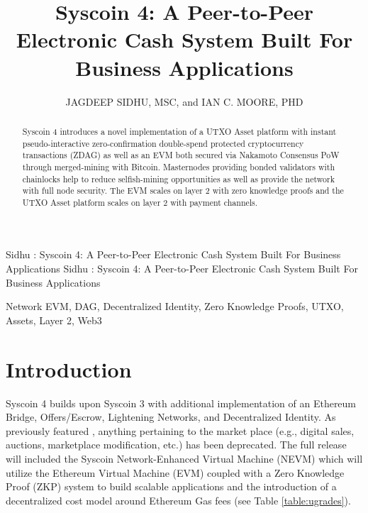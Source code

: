 \documentclass[peerreview]{ieeesyscoin}
\begin{document}
\linenumbers
\history{}

\title{\centering Syscoin 4: A Peer-to-Peer Electronic Cash System Built For Business Applications}
\author{\centering  \uppercase{Jagdeep Sidhu, MSc}, 
and \uppercase{Ian C. Moore, PhD}}

\address[1]{\centering Syscoin Core Developer, Blockchain Foundry Inc.(e-mail: jsidhu@blockchainfoundry.co)}
\address[2]{\centering  (Syscoin Researcher, e-mail: imoore@syscoin.org)}
\tfootnote{}

\markboth
{Sidhu \headeretal: Syscoin 4: A Peer-to-Peer Electronic Cash System Built For Business Applications}
{Sidhu \headeretal: Syscoin 4: A Peer-to-Peer Electronic Cash System Built For Business Applications}

\corresp{}

\begin{abstract}
Syscoin 4 introduces a novel implementation of a UTXO Asset platform with instant pseudo-interactive zero-confirmation double-spend protected cryptocurrency transactions (ZDAG) as well as an EVM both secured via Nakamoto Consensus PoW through merged-mining with Bitcoin. Masternodes providing bonded validators with chainlocks help to reduce selfish-mining opportunities as well as provide the network with full node security. The EVM scales on layer 2 with zero knowledge proofs and the UTXO Asset platform scales on layer 2 with payment channels.
\end{abstract}

\begin{keywords}
Network EVM, DAG, Decentralized Identity, Zero Knowledge Proofs, UTXO, Assets, Layer 2, Web3
\end{keywords}

\titlepgskip=-15pt

\maketitle

\section{Introduction}
\label{sec:introduction}

Syscoin 4 builds upon Syscoin 3 with additional implementation of an Ethereum Bridge, Offers/Escrow, Lightening Networks, and Decentralized Identity. As previously featured \cite{Sida18}, anything pertaining to the market place (e.g., digital sales, auctions, marketplace modification, etc.) has been deprecated. The full release will included the Syscoin Network-Enhanced Virtual Machine (NEVM) which will utilize the Ethereum Virtual Machine (EVM) coupled with a Zero Knowledge Proof (ZKP) system to build scalable applications and the introduction of a decentralized cost model around Ethereum Gas fees (see Table \ref{table:ugrades}).
\end{document}
